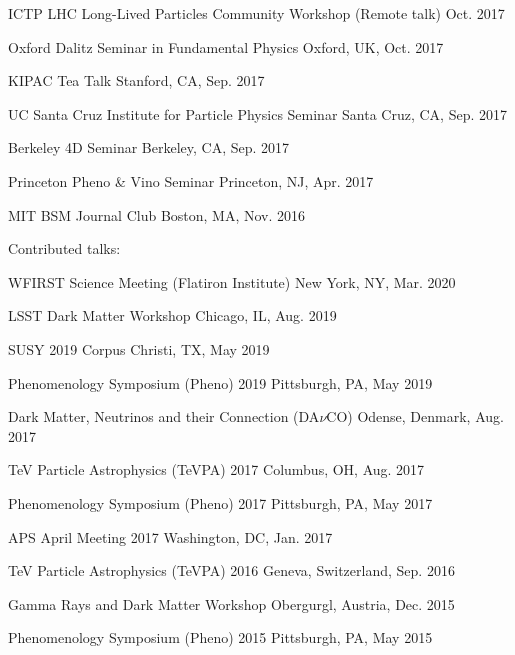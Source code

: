 \documentclass[11pt]{article}
\newenvironment{packed_itemize}{
\begin{itemize}[label=\raisebox{0.25ex}{\tiny$\bullet$}]
  \setlength{\itemsep}{3pt}
  \setlength{\parskip}{0pt}
  \setlength{\parsep}{0pt}}{\end{itemize}
}
\begin{document}
\begin{packed_itemize}
\item ICTP LHC Long-Lived Particles Community Workshop (Remote talk) \hfill Oct. 2017
\item Oxford Dalitz Seminar in Fundamental Physics  \hfill Oxford, UK, Oct. 2017
\item KIPAC Tea Talk  \hfill Stanford, CA, Sep. 2017
\item UC Santa Cruz Institute for Particle Physics Seminar  \hfill Santa Cruz, CA, Sep. 2017
\item Berkeley 4D Seminar  \hfill Berkeley, CA, Sep. 2017
\item Princeton Pheno \& Vino Seminar \hfill Princeton, NJ, Apr. 2017
\item MIT BSM Journal Club \hfill Boston, MA, Nov. 2016
\end{packed_itemize}

\noindent
Contributed talks:
\begin{packed_itemize}
  \item WFIRST Science Meeting (Flatiron Institute) \hfill New York, NY, Mar. 2020
  \item LSST Dark Matter Workshop \hfill Chicago, IL, Aug. 2019
  \item SUSY 2019 \hfill Corpus Christi, TX, May 2019
  \item Phenomenology Symposium (Pheno) 2019 \hfill Pittsburgh, PA, May 2019
  \item Dark Matter, Neutrinos and their Connection (DA$\nu$CO) \hfill Odense, Denmark, Aug. 2017
  \item TeV Particle Astrophysics (TeVPA) 2017 \hfill Columbus, OH, Aug. 2017 
  \item Phenomenology Symposium (Pheno) 2017 \hfill Pittsburgh, PA, May 2017 
  \item APS April Meeting 2017 \hfill Washington, DC, Jan. 2017 
  \item TeV Particle Astrophysics (TeVPA) 2016 \hfill Geneva, Switzerland, Sep. 2016 
  \item Gamma Rays and Dark Matter Workshop \hfill Obergurgl, Austria, Dec. 2015
  \item Phenomenology Symposium (Pheno) 2015 \hfill Pittsburgh, PA, May 2015
  
\end{packed_itemize}



\vspace{2.0mm}
\end{document}
